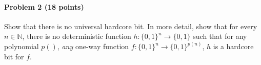 \paragraph{Problem 2 (18 points)}
Show that there is no universal hardcore bit. 
In more detail, show that for every $n\in\mathbb{N}$, there is no deterministic function $h: \{0,1\}^n \to \{0,1\}$ such that for any polynomial $p()$, \emph{any} one-way function $f: \{0,1\}^n \to \{0,1\}^{p(n)}$, $h$ is a hardcore bit for $f$. 